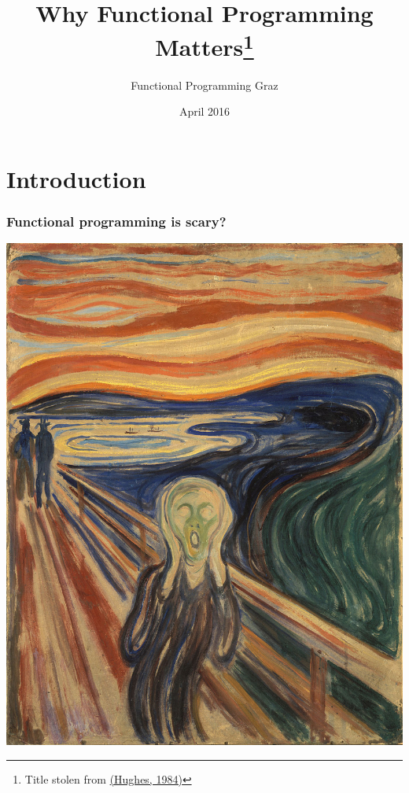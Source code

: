 \documentclass{beamer}
\author{Functional Programming Graz}
\title{Why Functional Programming Matters\footnote{Title stolen from
    \href{http://www.cse.chalmers.se/\~rjmh/Papers/whyfp.pdf}{(Hughes, 1984)}}}
\date{April 2016}
\begin{document}
\begin{frame}
  \maketitle
\end{frame}

\section{Introduction}

\begin{frame}[containsverbatim]
  \frametitle{Functional programming is scary?}
  \begin{center}
    \href{https://upload.wikimedia.org/wikipedia/commons/9/9d/The_Scream_by_Edvard_Munch%2C_1893_-_Nasjonalgalleriet.png}{%
      \includegraphics[height=0.7\textheight]{fig/munch}}
  \end{center}
\end{frame}
\end{document}
